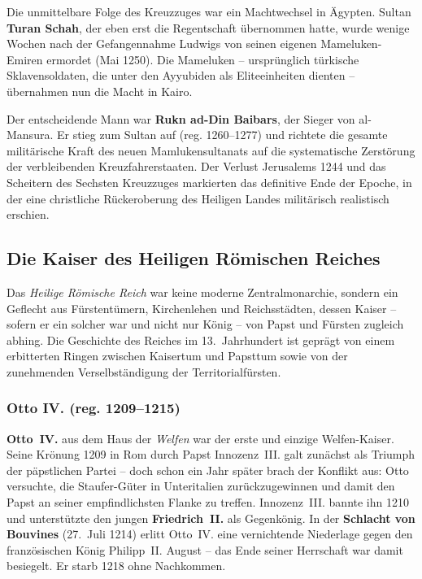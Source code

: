 Die unmittelbare Folge des Kreuzzuges war ein Machtwechsel in Ägypten. Sultan \textbf{Turan Schah}, der eben erst die Regentschaft übernommen hatte, wurde wenige Wochen nach der Gefangennahme Ludwigs von seinen eigenen Mameluken-Emiren ermordet (Mai 1250). Die Mameluken -- ursprünglich türkische Sklavensoldaten, die unter den Ayyubiden als Eliteeinheiten dienten -- übernahmen nun die Macht in Kairo.

Der entscheidende Mann war \textbf{Rukn ad-Din Baibars}, der Sieger von al-Mansura. Er stieg zum Sultan auf (reg. 1260--1277) und richtete die gesamte militärische Kraft des neuen Mamlukensultanats auf die systematische Zerstörung der verbleibenden Kreuzfahrerstaaten. Der Verlust Jerusalems 1244 und das Scheitern des Sechsten Kreuzzuges markierten das definitive Ende der Epoche, in der eine christliche Rückeroberung des Heiligen Landes militärisch realistisch erschien.

\subsection{Die Kaiser des Heiligen Römischen Reiches}\label{kaiser_des_hrr}

Das \textit{Heilige Römische Reich} war keine moderne Zentralmonarchie, sondern ein Geflecht aus Fürstentümern, Kirchenlehen und Reichsstädten, dessen Kaiser -- sofern er ein solcher war und nicht nur König -- von Papst und Fürsten zugleich abhing. Die Geschichte des Reiches im 13.~Jahrhundert ist geprägt von einem erbitterten Ringen zwischen Kaisertum und Papsttum sowie von der zunehmenden Verselbständigung der Territorialfürsten. \cite{niederstaetter_oesterreich}

\subsubsection{Otto IV. (reg. 1209--1215)}\label{kaiser_otto_iv}

\textbf{Otto~IV.} aus dem Haus der \textit{Welfen} war der erste und einzige Welfen-Kaiser. Seine Krönung 1209 in Rom durch Papst Innozenz~III. galt zunächst als Triumph der päpstlichen Partei -- doch schon ein Jahr später brach der Konflikt aus: Otto versuchte, die Staufer-Güter in Unteritalien zurückzugewinnen und damit den Papst an seiner empfindlichsten Flanke zu treffen. Innozenz~III. bannte ihn 1210 und unterstützte den jungen \textbf{Friedrich~II.} als Gegenkönig. In der \textbf{Schlacht von Bouvines} (27.~Juli 1214) erlitt Otto~IV. eine vernichtende Niederlage gegen den französischen König Philipp~II. August -- das Ende seiner Herrschaft war damit besiegelt. Er starb 1218 ohne Nachkommen. \cite{niederstaetter_oesterreich}

